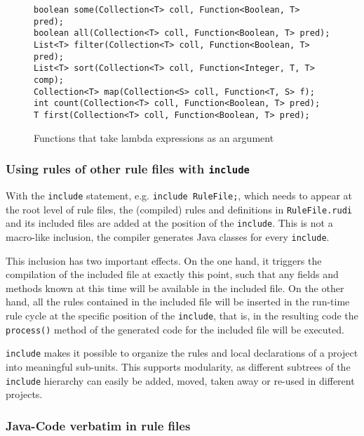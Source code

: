 \begin{figure}[htbp]
\small%
\begin{lstlisting}
boolean some(Collection<T> coll, Function<Boolean, T> pred);
boolean all(Collection<T> coll, Function<Boolean, T> pred);
List<T> filter(Collection<T> coll, Function<Boolean, T> pred);
List<T> sort(Collection<T> coll, Function<Integer, T, T> comp);
Collection<T> map(Collection<S> coll, Function<T, S> f);
int count(Collection<T> coll, Function<Boolean, T> pred);
T first(Collection<T> coll, Function<Boolean, T> pred);
\end{lstlisting}\vspace*{-2ex}
\caption{\label{tab:lambda-functions}Functions that take lambda expressions as an argument}
\end{figure}


\subsubsection{Using rules of other rule files with \texttt{include}}

With the \texttt{include} statement, e.g. \texttt{include RuleFile;},
which needs to appear at the root level of rule files, the (compiled)
rules and definitions in \texttt{RuleFile.rudi} and its included files
are added at the position of the \texttt{include}. This is not a
macro-like inclusion, the compiler generates Java classes for every
\texttt{include}.

This inclusion has two important effects. On the one hand, it triggers
the compilation of the included file at exactly this point, such that
any fields and methods known at this time will be available in the
included file. On the other hand, all the rules contained in the
included file will be inserted in the run-time rule cycle at the
specific position of the \texttt{include}, that is, in the resulting
code the \texttt{process()} method of the generated code for the
included file will be executed.

\texttt{include} makes it possible to organize the rules and local
declarations of a project into meaningful sub-units. This supports
modularity, as different subtrees of the \texttt{include} hierarchy can
easily be added, moved, taken away or re-used in different projects.

\subsubsection{Java-Code verbatim in rule files} \label{sec:rudi-verbatim}

